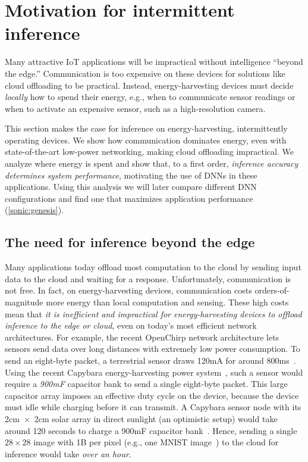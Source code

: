 \section{Motivation for intermittent inference}
\label{sonic:motivation}

Many attractive IoT applications will be impractical without
intelligence ``beyond the edge.''
%
Communication is too expensive on these devices for
solutions like cloud offloading to be practical.
%
Instead, energy-harvesting devices must decide \emph{locally} how to
spend their energy, e.g., when to communicate sensor readings or when
to activate an expensive sensor, such as a high-resolution camera.
%

This section makes the case for inference on energy-harvest\-ing,
intermittently operating devices.
%
We show how communication dominates energy, even with
state-of-the-art low-power networking,
making cloud offloading impractical.
%
We analyze where energy is spent
and show that, to a first order, \emph{inference accuracy determines
  system performance},
motivating the use of DNNs in these applications.
%
Using this analysis we will later compare different DNN
configurations and find one that maximizes application
performance (\autoref{sonic:genesis}).

\subsection{The need for inference beyond the edge}
%
Many applications today offload most computation to the cloud by sending input data to the cloud and waiting for a response.
Unfortunately, communication is not free.
In fact, on energy-harvesting devices,
communication costs orders-of-magnitude more energy than local computation and sensing.
%
These high costs mean that \emph{it is inefficient and impractical for
  energy-harvesting devices to offload inference to the edge or
  cloud}, even on today's most efficient network architectures.
%
For example, the recent OpenChirp network architecture lets sensors
send data over long distances with extremely low power consumption.
%
To send an eight-byte packet, a terrestrial sensor draws 120mA for around
800ms~\cite{dongare2017openchirp}.
%
Using the recent Capybara energy-harvesting power system~\cite{capybara}, such a
sensor would require a {\em 900mF} capacitor bank to send a
single eight-byte packet. 
% 
This large capacitor array imposes an effective duty cycle on the
device, because the device must idle while charging before
it can transmit. 
%
A Capybara sensor node with its
2cm~$\times$~2cm solar array in direct sunlight (an optimistic setup) would take around 120 seconds
to charge a 900mF capacitor bank~\cite{capybara}.
%
Hence, sending a single $28 \times 28$ image with 1B per pixel (e.g.,
one MNIST image~\cite{lecun1998mnist}) to the cloud for inference would 
take {\em over an hour}.

